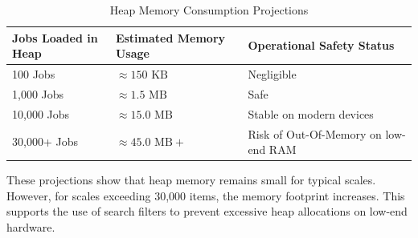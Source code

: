 \begin{table}[htbp]
\centering
\caption{Heap Memory Consumption Projections}
\label{tab:memory_projections}
\begin{tabular}{|l|l|l|}
\hline
\textbf{Jobs Loaded in Heap} & \textbf{Estimated Memory Usage} & \textbf{Operational Safety Status} \\ \hline
100 Jobs & $\approx 150\text{ KB}$ & Negligible \\ \hline
1,000 Jobs & $\approx 1.5\text{ MB}$ & Safe \\ \hline
10,000 Jobs & $\approx 15.0\text{ MB}$ & Stable on modern devices \\ \hline
30,000+ Jobs & $\approx 45.0\text{ MB}+$ & Risk of Out-Of-Memory on low-end RAM \\ \hline
\end{tabular}
\end{table}

These projections show that heap memory remains small for typical scales. However, for scales exceeding 30,000 items, the memory footprint increases. This supports the use of search filters to prevent excessive heap allocations on low-end hardware.
